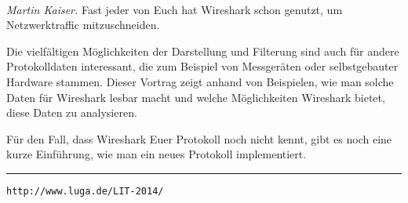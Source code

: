 \documentclass[10pt,a4paper,ngerman,landscape]{scrartcl}
\let\origdescription\description
\renewenvironment{description}{
  \setlength{\leftmargini}{0em}
  \origdescription
  \setlength{\itemindent}{0em}
  \setlength{\itemsep}{1.2em}
  \setlength{\labelsep}{\textwidth}
}
{\endlist}
\newcommand{\vorschub}{\mbox{}\\[-0.5em]}
\begin{document}
\begin{multicols}{3}
\begin{description}
\item[Wireshark ohne Netzwerk]\vorschub
\textsl{Martin Kaiser.}
Fast jeder von Euch hat Wireshark schon genutzt, um Netzwerktraffic
mitzuschneiden.

Die vielfältigen Möglichkeiten der Darstellung und Filterung sind auch für
andere Protokolldaten interessant, die zum Beispiel von Messgeräten oder selbstgebauter
Hardware stammen. Dieser Vortrag zeigt anhand von Beispielen, wie man solche
Daten für Wireshark lesbar macht und welche Möglichkeiten Wireshark bietet,
diese Daten zu analysieren.

Für den Fall, dass Wireshark Euer Protokoll noch nicht kennt, gibt es noch eine
kurze Einführung, wie man ein neues Protokoll implementiert.
\vfill

\end{description}
\raggedleft\rule{0.7\linewidth}{0.25pt}
\scriptsize

\raggedleft\texttt{http://www.luga.de/LIT-2014/}

\end{multicols}
\end{document}
